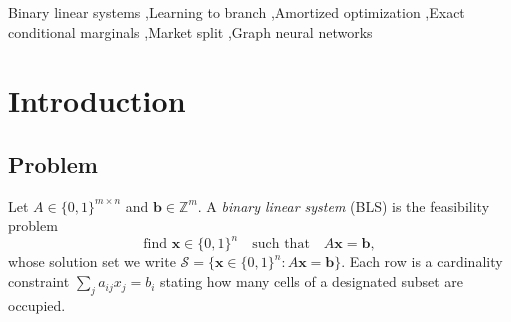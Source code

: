 \documentclass[preprint,12pt]{elsarticle}
\newcommand{\SOL}{\mathcal{S}}
\begin{document}
\begin{frontmatter}
\begin{abstract}
We also report what the method does not achieve. CP-SAT solves the same instances $9$--$40\times$ faster at every size tested ($9$--$10\times$ at $21\times60$ after fine-tuning), and our system does not compete with it; decomposing that gap shows our branching produces $2.2\times$ \emph{fewer} nodes but processes them $32\times$ more slowly, which places the deficit in per-node cost rather than in branching quality, though we do not show that it is recoverable. And the cost advantage over probing, while asymptotically real, is only $1.3$--$1.7\times$ at the depths where prediction matters most on our instances, where probing additionally offers proofs rather than predictions. The contribution we claim is therefore methodological: exact conditional posteriors are an obtainable and well-posed supervision signal for branching, in-tree states are a better training distribution than root states --- a root-trained network is worse than relaxation rounding when deployed in the tree, an in-tree-trained one is better by $3.4$ points --- and the resulting heuristic transfers across instance size. Code, generators, exact-marginal labels and per-instance results are released.
\end{abstract}

\begin{keyword}
Binary linear systems \sep Learning to branch \sep Amortized optimization \sep Exact conditional marginals \sep Market split \sep Graph neural networks
\end{keyword}

\end{frontmatter}

\linenumbers

\section{Introduction}
\label{sec:intro}

\subsection{Problem}

Let $A\in\{0,1\}^{m\times n}$ and $\mathbf{b}\in\mathbb{Z}^m$. A \emph{binary linear system} (BLS) is the feasibility problem
\begin{equation}
\text{find } \mathbf{x}\in\{0,1\}^n \quad\text{such that}\quad A\mathbf{x}=\mathbf{b},
\label{eq:bls}
\end{equation}
whose solution set we write $\SOL=\{\mathbf{x}\in\{0,1\}^n : A\mathbf{x}=\mathbf{b}\}$. Each row is a cardinality constraint $\sum_{j}a_{ij}x_j=b_i$ stating how many cells of a designated subset are occupied.
\end{document}

